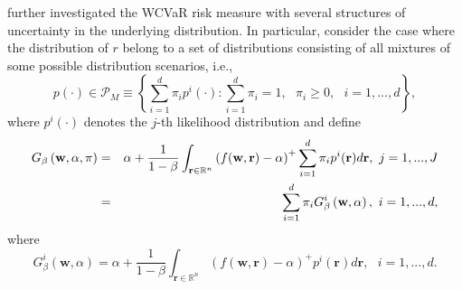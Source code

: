 \documentclass[a4paper,12pt]{report}
\begin{document}
\citet*{zhu2009worst} further investigated the WCVaR risk measure with
several structures of uncertainty in the underlying distribution. In
particular, \citet*{zhu2009worst} consider the case where the distribution
of $r$ belong to a set of distributions consisting of all mixtures of some
possible distribution scenarios, i.e.,
\begin{equation}
p\left( \cdot \right) \in \mathcal{P}_{M}\equiv \left\{ \sum_{i=1}^{d}\pi
_{i}p^{i}\left( \cdot \right) :\sum_{i=1}^{d}\pi _{i}=1,\text{ }\pi _{i}\geq
0,\text{ }i=1,...,d\right\} ,  \label{15}
\end{equation}%
where $p^{i}\left( \cdot \right) $ denotes the $j$-th likelihood
distribution and define
\begin{eqnarray}
G_{\beta }\left( \mathbf{w},\alpha ,\pi \right) &=&\alpha +\frac{1}{1-\beta }%
\int_{\mathbf{r}\in
	\mathbb{R}
	^{n}}\left( f(\mathbf{w},\mathbf{r})-\alpha \right) ^{+}\sum_{i=1}^{d}\pi
_{i}p^{i}(\mathbf{r})d\mathbf{r},\text{ }j=1,...,J  \notag \\
&=&\sum_{i=1}^{d}\pi _{i}G_{\beta }^{i}\left( \mathbf{w},\alpha \right) ,%
\text{ }i=1,...,d,  \label{16}
\end{eqnarray}%
where%
\begin{equation}
G_{\beta }^{i}\left( \mathbf{w},\alpha \right) =\alpha +\frac{1}{1-\beta }%
\int_{\mathbf{r}\in
	\mathbb{R}
	^{n}}\left( f(\mathbf{w},\mathbf{r})-\alpha \right) ^{+}p^{i}(\mathbf{r})d%
\mathbf{r},\text{ }i=1,...,d.  \label{17}
\end{equation}%
\end{document}
